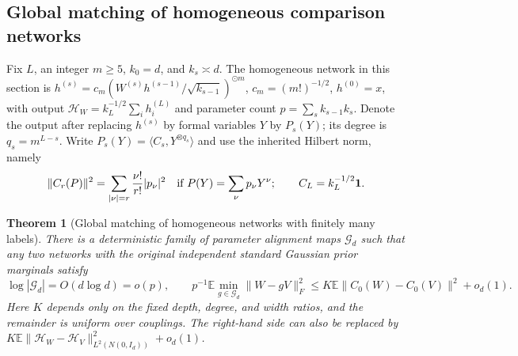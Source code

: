 \documentclass[a4paper]{tufte-handout}
\newtheorem{theorem}{Theorem}
\begin{document}
\begin{fullwidth}
\section{Global matching of homogeneous comparison networks}\label{hm:section}\label{app:matching}
Fix $L$, an integer $m\ge5$, $k_0=d$, and $k_s\asymp d$. The homogeneous network in this section is
$h^{(s)}=c_m(W^{(s)}h^{(s-1)}/\sqrt{k_{s-1}})^{\odot m}$,
$c_m=(m!)^{-1/2}$, $h^{(0)}=x$, with output
$\mathcal H_W=k_L^{-1/2}\sum_i h_i^{(L)}$ and parameter count $p=\sum_s k_{s-1}k_s$.
Denote the output after replacing $h^{(s)}$ by formal variables $Y$ by $P_s(Y)$; its degree is $q_s=m^{L-s}$.
Write $P_s(Y)=\langle C_s,Y^{\otimes q_s}\rangle$ and use the inherited Hilbert norm, namely
\begin{equation}\label{hm:coeff-norm}
 \|C_r(P)\|^2=\sum_{|\nu|=r}\frac{\nu!}{r!}|p_\nu|^2
 \quad\text{if }P(Y)=\sum_\nu p_\nu Y^\nu;
 \qquad C_L=k_L^{-1/2}{\bf1}.
\end{equation}
\begin{theorem}[Global matching of homogeneous networks with finitely many labels]\label{hm:global-matching}
There is a deterministic family of parameter alignment maps $\mathcal G_d$ such that any two networks with the original independent standard Gaussian prior marginals satisfy
\begin{equation}\label{hm:main}
 \log|\mathcal G_d|=O(d\log d)=o(p),\qquad
 p^{-1}\mathbb E\min_{g\in\mathcal G_d}\|W-gV\|_F^2
 \le K\mathbb E\|C_0(W)-C_0(V)\|^2+o_d(1).
\end{equation}
Here $K$ depends only on the fixed depth, degree, and width ratios, and the remainder is uniform over couplings.
The right-hand side can also be replaced by $K\mathbb E\|\mathcal H_W-\mathcal H_V\|_{L^2(N(0,I_d))}^2+o_d(1)$.
\end{theorem}


\end{fullwidth}
\end{document}
